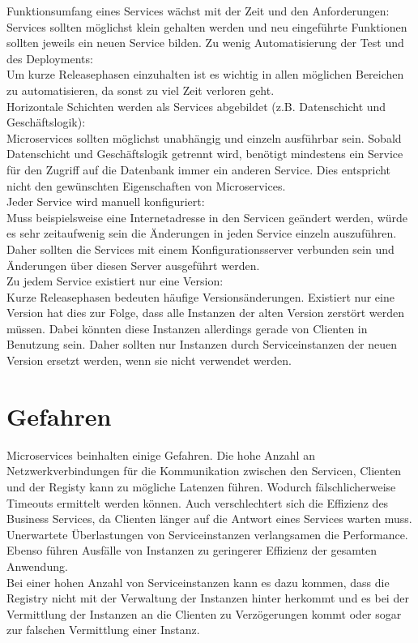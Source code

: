 Funktionsumfang eines Services wächst mit der Zeit und den Anforderungen:\\
Services sollten möglichst klein gehalten werden und neu eingeführte Funktionen sollten jeweils ein neuen Service bilden.
Zu wenig Automatisierung der Test und des Deployments:\\
Um kurze Releasephasen einzuhalten ist es wichtig in allen möglichen Bereichen zu automatisieren, da sonst zu viel Zeit verloren geht.\\
Horizontale Schichten werden als Services abgebildet (z.B. Datenschicht und Geschäftslogik):\\
Microservices sollten möglichst unabhängig und einzeln ausführbar sein. Sobald Datenschicht und Geschäftslogik getrennt wird, benötigt mindestens ein Service für den Zugriff auf die Datenbank immer ein anderen Service. Dies entspricht nicht den gewünschten Eigenschaften von Microservices.\\
Jeder Service wird manuell konfiguriert:\\
Muss beispielsweise eine Internetadresse in den Servicen geändert werden, würde es sehr zeitaufwenig sein die Änderungen in jeden Service einzeln auszuführen. Daher sollten die Services mit einem Konfigurationsserver verbunden sein und Änderungen über diesen Server ausgeführt werden.\\
Zu jedem Service existiert nur eine Version:\\
Kurze Releasephasen bedeuten häufige Versionsänderungen. Existiert nur eine Version hat dies zur Folge, dass alle Instanzen der alten Version zerstört werden müssen. Dabei könnten diese Instanzen allerdings gerade von Clienten in Benutzung sein. Daher sollten nur Instanzen durch Serviceinstanzen der neuen Version ersetzt werden, wenn sie nicht verwendet werden.\\




\section{Gefahren}

Microservices beinhalten einige Gefahren. Die hohe Anzahl an Netzwerkverbindungen für die Kommunikation zwischen den Servicen, Clienten und der Registy kann zu mögliche Latenzen führen. Wodurch fälschlicherweise Timeouts ermittelt werden können. Auch verschlechtert sich die Effizienz des Business Services, da Clienten länger auf die Antwort eines Services warten muss.\\
Unerwartete Überlastungen von Serviceinstanzen verlangsamen die Performance. Ebenso führen Ausfälle von Instanzen zu geringerer Effizienz der gesamten Anwendung.\\
Bei einer hohen Anzahl von Serviceinstanzen kann es dazu kommen, dass die Registry nicht mit der Verwaltung der Instanzen hinter herkommt und es bei der Vermittlung der Instanzen an die Clienten zu Verzögerungen kommt oder sogar zur falschen Vermittlung einer Instanz.

